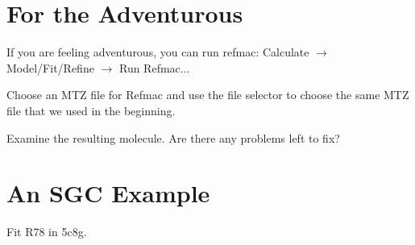 \documentclass{article}
\begin{document}
\section{For the Adventurous}

If you are feeling adventurous, you can run refmac: \textsf{Calculate
  $\rightarrow$ Model/Fit/Refine $\rightarrow$ Run Refmac...}

 Choose an MTZ file for Refmac and use the file selector to choose the
 same MTZ file that we used in the beginning.

 Examine the resulting molecule.  Are there any problems left to fix?

\section{An SGC Example}

Fit R78 in 5c8g.
\end{document}

